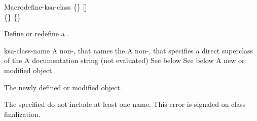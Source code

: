 \documentclass[10pt,twoside,english,pdftex]{article}
\begin{document}
\begin{functiondoc}{Macro}{define-ksa-class}%
   { 
   \code{(}\{\}\superstar\code{)}
   [] \\
   \code{(}\{\}\superstar\code{)}
   \{\}\superstar{}
   \returns{} }
%
%
%

\fnsyntax

\fnpurpose Define or redefine a .

\fnpackage {}

\fnmodule {}

\fnargs
\begin{args}{ksa-class-name}
 A non-\nil,  that names the
 A non-\nil,  that specifies a
direct superclass of the    
\arg[documentation] A documentation string (not evaluated)
 See below
 See below
 A new or modified  object
\end{args}

\fnreturns The newly defined or modified  object.

\fnerrors The specified  do not include at least
one  name.  This error is signaled on class finalization.


\end{functiondoc}
\end{document}
